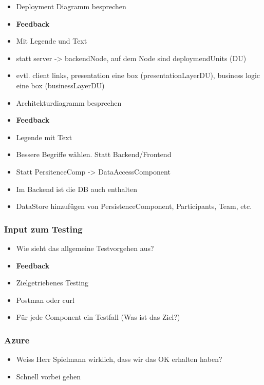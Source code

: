 \begin{itemize}

\item
  Deployment Diagramm besprechen
  \item \textbf{Feedback}
\item
  Mit Legende und Text
\item
  statt server -\textgreater{} backendNode, auf dem Node sind
  deploymendUnits (DU)
\item
  evtl. client links, presentation eine box (presentationLayerDU),
  business logic eine box (businessLayerDU)
\item
  Architekturdiagramm besprechen
\item \textbf{Feedback}
\item
  Legende mit Text
\item
  Bessere Begriffe wählen. Statt Backend/Frontend
\item
  Statt PersitenceComp -\textgreater{} DataAccessComponent
\item
  Im Backend ist die DB auch enthalten
\item
  DataStore hinzufügen von PersistenceComponent, Participants, Team,
  etc.
\end{itemize}

\hypertarget{input-zum-testing}{%
\subsubsection*{Input zum Testing}\label{input-zum-testing}}

\begin{itemize}

\item
  Wie sieht das allgemeine Testvorgehen aus?
\item \textbf{Feedback}
\item
  Zielgetriebenes Testing
\item
  Postman oder curl
\item
  Für jede Component ein Testfall (Was ist das Ziel?)
\end{itemize}

\hypertarget{azure}{%
\subsubsection*{Azure}\label{azure}}

\begin{itemize}

\item
  Weiss Herr Spielmann wirklich, dass wir das OK erhalten haben?
\item
  Schnell vorbei gehen
\end{itemize}

